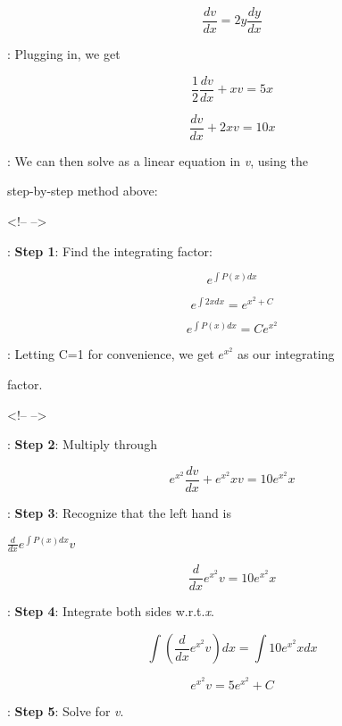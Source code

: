 $$\frac{dv}{dx}=2y\frac{dy}{dx}$$



:   Plugging in, we get



$$\frac{1}{2}\frac{dv}{dx}+xv=5x$$



$$\frac{dv}{dx}+2xv=10x$$



:   We can then solve as a linear equation in \textit{v}, using the

    step-by-step method above:



<!-- -->



:   \textbf{Step 1}: Find the integrating factor:



$$e^{\int P(x)dx}$$



$$e^{\int 2x dx}=e^{x^2+C}$$



$$e^{\int P(x)dx}=Ce^{x^2}$$



:   Letting C=1 for convenience, we get $e^{x^2}$ as our integrating

    factor.



<!-- -->



:   \textbf{Step 2}: Multiply through



$$e^{x^2}\frac{dv}{dx}+e^{x^2}xv=10e^{x^2}x$$



:   \textbf{Step 3}: Recognize that the left hand is

    $\frac{d}{dx} e^{\int P(x)dx}v$



$$\frac{d}{dx} e^{x^2}v=10e^{x^2}x$$



:   \textbf{Step 4}: Integrate both sides w.r.t.\textit{x}.



$$\int (\frac{d}{dx} e^{x^2}v)dx=\int 10e^{x^2}xdx$$



$$e^{x^2}v=5e^{x^2}+C$$



:   \textbf{Step 5}: Solve for \textit{v}.



